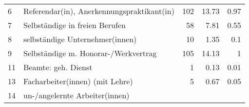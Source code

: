 \begin{longtable}{lXrrr}
     6 &
     \multicolumn{1}{X}{ Referendar(in), Anerkennungspraktikant(in)   } &


       \num{102} &
       \num[round-mode=places,round-precision=2]{13,73} &
         \num[round-mode=places,round-precision=2]{0,97} \\

     7 &
     \multicolumn{1}{X}{ Selbständige in freien Berufen   } &


       \num{58} &
       \num[round-mode=places,round-precision=2]{7,81} &
         \num[round-mode=places,round-precision=2]{0,55} \\

     8 &
     \multicolumn{1}{X}{ selbständige Unternehmer(innen)   } &


       \num{10} &
       \num[round-mode=places,round-precision=2]{1,35} &
         \num[round-mode=places,round-precision=2]{0,1} \\

     9 &
     \multicolumn{1}{X}{ Selbständige m. Honorar-/Werkvertrag   } &


       \num{105} &
       \num[round-mode=places,round-precision=2]{14,13} &
         \num[round-mode=places,round-precision=2]{1} \\

     11 &
     \multicolumn{1}{X}{ Beamte: geh. Dienst   } &


       \num{1} &
       \num[round-mode=places,round-precision=2]{0,13} &
         \num[round-mode=places,round-precision=2]{0,01} \\

     13 &
     \multicolumn{1}{X}{ Facharbeiter(innen) (mit Lehre)   } &


       \num{5} &
       \num[round-mode=places,round-precision=2]{0,67} &
         \num[round-mode=places,round-precision=2]{0,05} \\

     14 &
     \multicolumn{1}{X}{ un-/angelernte Arbeiter(innen)   } &



\end{longtable}
